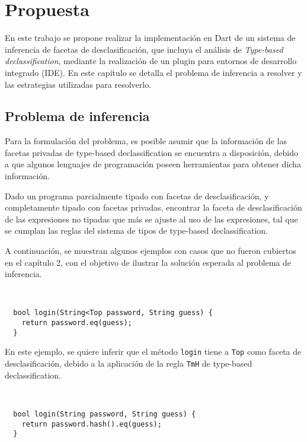\chapter{Propuesta}

En este trabajo se propone realizar la implementación en Dart de un sistema de inferencia de facetas de desclasificación, que incluya el análisis de \textit{Type-based declassification}, mediante la realización de un plugin para entornos de desarrollo integrado (IDE). En este capítulo se detalla el problema de inferencia a resolver y las estrategias utilizadas para resolverlo.

\section{Problema de inferencia}
Para la formulación del problema, es posible asumir que la información de las facetas privadas de type-based declassification se encuentra a disposición, debido a que algunos lenguajes de programación poseen herramientas para obtener dicha información.

\begin{defn}
  Dado un programa parcialmente tipado con facetas de desclasificación, y completamente tipado con facetas privadas, encontrar la faceta de desclasificación de las expresiones no tipadas que más se ajuste al uso de las expresiones, tal que se cumplan las reglas del sistema de tipos de type-based declassification.
\end{defn}

A continuación, se muestran algunos ejemplos con casos que no fueron cubiertos en el capítulo 2, con el objetivo de ilustrar la solución esperada al problema de inferencia.

\begin{ej} \ \\
  \normalfont
\begin{lstlisting}
  bool login(String<Top password, String guess) {
    return password.eq(guess);
  }
\end{lstlisting}
\end{ej}


En este ejemplo, se quiere inferir que el método \texttt{login} tiene a \texttt{Top} como faceta de desclasificación, debido a la aplicación de la regla \texttt{TmH} de type-based declassification.

\begin{ej} \ \\
  \normalfont
\begin{lstlisting}
  bool login(String password, String guess) {
    return password.hash().eq(guess);
  }
\end{lstlisting}
\end{ej}

